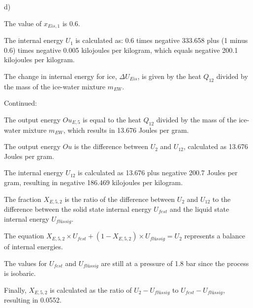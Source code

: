 d)

The value of \( x_{Eis,1} \) is 0.6.

The internal energy \( U_1 \) is calculated as:
0.6 times negative 333.658 plus (1 minus 0.6) times negative 0.005 kilojoules per kilogram,
which equals negative 200.1 kilojoules per kilogram.

The change in internal energy for ice, \( \Delta U_{Eis} \), is given by the heat \( Q_{12} \) divided by the mass of the ice-water mixture \( m_{EW} \).

Continued:

The output energy \( Ou_{E,5} \) is equal to the heat \( Q_{12} \) divided by the mass of the ice-water mixture \( m_{EW} \), which results in 13.676 Joules per gram.

The output energy \( Ou \) is the difference between \( U_2 \) and \( U_{12} \), calculated as 13.676 Joules per gram.

The internal energy \( U_{12} \) is calculated as 13.676 plus negative 200.7 Joules per gram, resulting in negative 186.469 kilojoules per kilogram.

The fraction \( X_{E,5,2} \) is the ratio of the difference between \( U_2 \) and \( U_{12} \) to the difference between the solid state internal energy \( U_{fest} \) and the liquid state internal energy \( U_{flüssig} \).

The equation \( X_{E,5,2} \times U_{fest} + (1 - X_{E,5,2}) \times U_{flüssig} = U_2 \) represents a balance of internal energies.

The values for \( U_{fest} \) and \( U_{flüssig} \) are still at a pressure of 1.8 bar since the process is isobaric.

Finally, \( X_{E,5,2} \) is calculated as the ratio of \( U_2 - U_{flüssig} \) to \( U_{fest} - U_{flüssig} \), resulting in 0.0552.